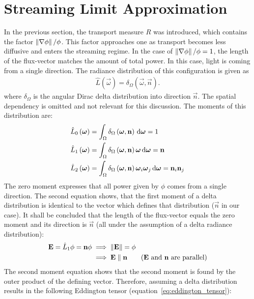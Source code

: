\section{Streaming Limit Approximation}
\label{sec:fld_streaming_limit_approximation}

In the previous section, the transport measure $R$ was introduced, which contains the factor $\left\lVert\nabla\phi\right\rVert/\phi$. This factor approaches one as transport becomes less diffusive and enters the streaming regime. In the case of $\left\lVert\nabla\phi\right\rVert/\phi=1$, the length of the flux-vector matches the amount of total power. In this case, light is coming from a single direction. The radiance distribution of this configuration is given as
\begin{align}
\hat{L}\left(\vec{\omega}\right)=\delta_{\Omega}\left(\vec{\omega},\vec{n}\right).
\end{align}
where $\delta_{\Omega}$ is the angular Dirac delta distribution into direction $\vec{n}$. The spatial dependency is omitted and not relevant for this discussion. The moments of this distribution are:
\begin{align}
\label{eq:zero_moment_Lhat}
\hat{L}_0\left(\boldsymbol{\mathbf{\omega}}\right)&=\int_{\Omega}{\delta_{\Omega}\left(\boldsymbol{\mathbf{\omega}},\boldsymbol{\mathbf{n}}\right)\,\mathrm{d}\boldsymbol{\mathbf{\omega}}} = 1\\
\label{eq:first_moment_Lhat}
\hat{L}_1\left(\boldsymbol{\mathbf{\omega}}\right)&=\int_{\Omega}{\delta_{\Omega}\left(\boldsymbol{\mathbf{\omega}},\boldsymbol{\mathbf{n}}\right)\boldsymbol{\mathbf{\omega}}\,\mathrm{d}\boldsymbol{\mathbf{\omega}}} = \boldsymbol{\mathbf{n}}\\
\label{eq:second_moment_Lhat}
\hat{L}_2\left(\boldsymbol{\mathbf{\omega}}\right)&=\int_{\Omega}{\delta_{\Omega}\left(\boldsymbol{\mathbf{\omega}},\boldsymbol{\mathbf{n}}\right)\boldsymbol{\mathbf{\omega}}_i\boldsymbol{\mathbf{\omega}}_j\,\mathrm{d}\boldsymbol{\mathbf{\omega}}} = \boldsymbol{\mathbf{n}}_i\boldsymbol{\mathbf{n}}_j
\end{align}
The zero moment expresses that all power given by $\phi$ comes from a single direction. The second equation shows, that the first moment of a delta distribution is identical to the vector which defines that distribution ($\vec{n}$ in our case). It shall be concluded that the length of the flux-vector equals the zero moment and its direction is $\vec{n}$ (all under the assumption of a delta radiance distribution):
\begin{align}
\label{eq:iso_delta_normE}
\boldsymbol{\mathbf{E}} = \hat{L}_1\phi = \boldsymbol{\mathbf{n}}\phi  &\implies \left\lVert\boldsymbol{\mathbf{E}}\right\rVert = \phi\\
&\implies \boldsymbol{\mathbf{E}} \parallel \boldsymbol{\mathbf{n}} \qquad \text{($\boldsymbol{\mathbf{E}}$ and $\boldsymbol{\mathbf{n}}$ are parallel)}
\end{align}
The second moment equation shows that the second moment is found by the outer product of the defining vector. Therefore, assuming a delta distribution results in the following Eddington tensor (equation~\ref{eq:eddington_tensor}):
